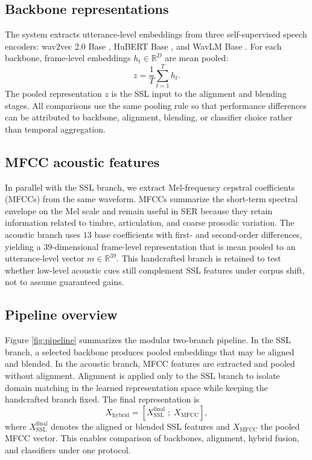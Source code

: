\documentclass[9pt,twocolumn,letterpaper]{article}
\begin{document}
\subsection{Backbone representations}
The system extracts utterance-level embeddings from three self-supervised speech encoders: wav2vec 2.0 Base \cite{baevski2020wav2vec}, HuBERT Base \cite{hsu2021hubert}, and WavLM Base \cite{chen2022wavlm}. For each backbone, frame-level embeddings $h_t \in \mathbb{R}^{D}$ are mean pooled:
\begin{equation}
z = \frac{1}{T}\sum_{t=1}^{T} h_t.
\end{equation}
The pooled representation $z$ is the SSL input to the alignment and blending stages. All comparisons use the same pooling rule so that performance differences can be attributed to backbone, alignment, blending, or classifier choice rather than temporal aggregation.

\subsection{MFCC acoustic features}
In parallel with the SSL branch, we extract Mel-frequency cepstral coefficients (MFCCs) from the same waveform. MFCCs summarize the short-term spectral envelope on the Mel scale and remain useful in SER because they retain information related to timbre, articulation, and coarse prosodic variation. The acoustic branch uses $13$ base coefficients with first- and second-order differences, yielding a $39$-dimensional frame-level representation that is mean pooled to an utterance-level vector $m \in \mathbb{R}^{39}$. This handcrafted branch is retained to test whether low-level acoustic cues still complement SSL features under corpus shift, not to assume guaranteed gains.

\subsection{Pipeline overview}
Figure \ref{fig:pipeline} summarizes the modular two-branch pipeline. In the SSL branch, a selected backbone produces pooled embeddings that may be aligned and blended. In the acoustic branch, MFCC features are extracted and pooled without alignment. Alignment is applied only to the SSL branch to isolate domain matching in the learned representation space while keeping the handcrafted branch fixed. The final representation is
\begin{equation}
X_{\mathrm{hybrid}} = \left[ X_{\mathrm{SSL}}^{\mathrm{final}} \; ; \; X_{\mathrm{MFCC}} \right],
\end{equation}
where $X_{\mathrm{SSL}}^{\mathrm{final}}$ denotes the aligned or blended SSL features and $X_{\mathrm{MFCC}}$ the pooled MFCC vector. This enables comparison of backbones, alignment, hybrid fusion, and classifiers under one protocol.
\end{document}

